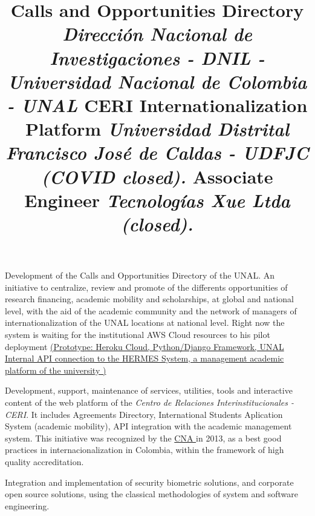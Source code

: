 \documentclass[overlapped,line,final]{res}
\begin{document}
\begin{resume}
\title{\bf Calls and Opportunities Directory
		\newline \em Dirección Nacional de Investigaciones - DNIL - Universidad Nacional de Colombia - UNAL
}
\begin{position}
	Development of the Calls and Opportunities Directory of the UNAL. An initiative to centralize, review and promote of the differents opportunities of research financing, academic mobility and scholarships, at global and national level, with the aid of the academic community and the network of managers of internationalization of the UNAL locations at national level. Right now the system is waiting for the institutional AWS Cloud resources to his pilot deployment \href{https://unal-dnil.herokuapp.com/}{(Prototype: Heroku Cloud, Python/Django Framework, UNAL Internal API connection to the HERMES System, a management academic platform of the university )}
\end{position}

\title{\bf CERI Internationalization Platform
	\newline \em Universidad Distrital Francisco José de Caldas - UDFJC (COVID closed).
}
\begin{position}
	Development, support, maintenance of services, utilities, tools and interactive content of the web platform of the \textit {Centro de Relaciones Interinstitucionales - CERI}. It includes Agreements Directory, International Students Aplication System (academic mobility), API integration with the academic management system. This initiative was recognized by the \href {https://www.cna.gov.co/portal/Divulgacion/Noticias/402269:Resultados-convocatoria-buenas-practicas-de-internacionalizacion-BPI-en-el-marco-de-la-acreditacion-de-alta-calidad}{CNA } in 2013, as a best good practices in internacionalization in Colombia, within the framework of high quality accreditation.
\end{position}

\title{\bf Associate Engineer
	\newline \em Tecnologías Xue Ltda (closed).
}
\begin{position}
Integration and implementation of security biometric solutions, and corporate open source solutions, using the classical methodologies of system and software engineering.
\end{position}


\end{resume}
\end{document}
